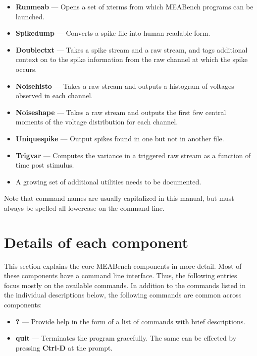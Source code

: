 \documentclass[12pt,oneside]{book}
\renewcommand{\sectionmark}[1]{}
\def\meabench{{MEABench}\xspace}
\def\prog#1{{\bf #1}}
\def\cmd#1{{\bf #1}}
\def\streamtype#1{{\sc #1}\xspace}
\def\raw{\streamtype{raw}}
\def\spike{\streamtype{spike}}
\def\eoi{{\bf Ctrl-D}\xspace}
\begin{document}
\begin{itemize}
\item \prog{Runmeab} --- Opens a set of xterms from which \meabench
programs can be launched.

\item \prog{Spikedump} --- Converts a \spike file into human readable form.

\item \prog{Doublectxt} --- Takes a \spike stream and a \raw stream,
and tags additional context on to the \spike information from the \raw
channel at which the spike occurs. 

\item \prog{Noisehisto} --- Takes a \raw stream and outputs a
histogram of voltages observed in each channel.

\item \prog{Noiseshape} --- Takes a \raw stream and outputs the first
few central moments of the voltage distribution for each channel.

\item \prog{Uniquespike} --- Output spikes found in one but not in
another file.

\item \prog{Trigvar} --- Computes the variance in a triggered \raw
stream as a function of time post stimulus.

\item A growing set of additional utilities needs to be documented.
\end{itemize}

Note that command names are usually capitalized in this
manual, but must always be spelled all lowercase on the command line.


\renewcommand{\sectionmark}[1]{\markright{#1}}

\chapter{Details of each component}

This section explains the core \meabench components in more detail.
Most of these components have a command line interface. Thus, the
following entries focus mostly on the available commands. In
addition to the commands listed in the individual descriptions below,
the following commands are common across components:

\begin{itemize}
\item \cmd{?} --- Provide help in the form of a list of commands with
brief descriptions.
\item \cmd{quit} --- Terminates the program gracefully. The same can be
effected by pressing \eoi at the prompt.
\end{itemize}
\end{document}
